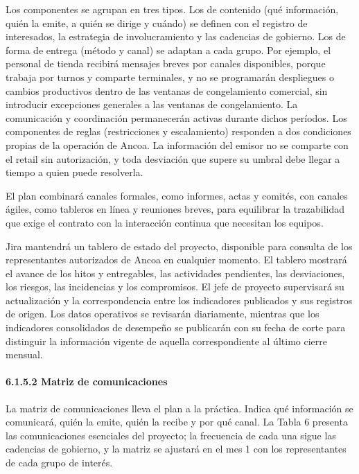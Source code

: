 \documentclass[11pt]{article}
\begin{document}
Los componentes se agrupan en tres tipos. Los de contenido (qué
información, quién la emite, a quién se dirige y cuándo) se definen con
el registro de interesados, la estrategia de involucramiento y las
cadencias de gobierno. Los de forma de entrega (método y canal) se
adaptan a cada grupo. Por ejemplo, el personal de tienda recibirá
mensajes breves por canales disponibles, porque trabaja por turnos y
comparte terminales, y no se programarán despliegues o cambios
productivos dentro de las ventanas de congelamiento comercial, sin
introducir excepciones generales a las ventanas de congelamiento. La
comunicación y coordinación permanecerán activas durante dichos
períodos. Los componentes de reglas (restricciones y escalamiento)
responden a dos condiciones propias de la operación de Ancoa. La
información del emisor no se comparte con el retail sin autorización, y
toda desviación que supere su umbral debe llegar a tiempo a quien puede
resolverla.

El plan combinará canales formales, como informes, actas y comités, con
canales ágiles, como tableros en línea y reuniones breves, para
equilibrar la trazabilidad que exige el contrato con la interacción
continua que necesitan los equipos.

Jira mantendrá un tablero de estado del proyecto, disponible para
consulta de los representantes autorizados de Ancoa en cualquier
momento. El tablero mostrará el avance de los hitos y entregables, las
actividades pendientes, las desviaciones, los riesgos, las incidencias y
los compromisos. El jefe de proyecto supervisará su actualización y la
correspondencia entre los indicadores publicados y sus registros de
origen. Los datos operativos se revisarán diariamente, mientras que los
indicadores consolidados de desempeño se publicarán con su fecha de
corte para distinguir la información vigente de aquella correspondiente
al último cierre mensual.

\paragraph{6.1.5.2 Matriz de comunicaciones}\label{6-1-5-2-matriz-de-comunicaciones}

La matriz de comunicaciones lleva el plan a la práctica. Indica qué información se comunicará, quién la emite, quién la recibe y por qué canal. La Tabla 6 presenta las comunicaciones esenciales del proyecto; la frecuencia de cada una sigue las cadencias de gobierno, y la matriz se ajustará en el mes 1 con los representantes de cada grupo de interés.
\end{document}
